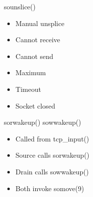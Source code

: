 \documentclass[14pt]{beamer}
\begin{document}
\begin{frame}{sounslice()}
\begin{itemize}
    \item Manual unsplice
    \item Cannot receive
    \item Cannot send
    \item Maximum
    \item Timeout
    \item Socket closed
\end{itemize}
\end{frame}

\begin{frame}{sorwakeup() sowwakeup()}
\begin{itemize}
    \item Called from tcp\_input()
    \item Source calls sorwakeup()
    \item Drain calls sowwakeup()
    \item Both invoke somove(9)
\end{itemize}
\end{frame}
\end{document}
